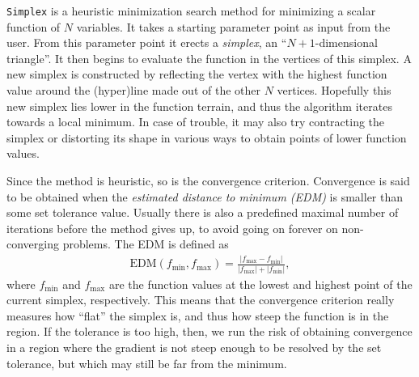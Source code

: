 \documentclass[twoside,english]{uiofysmaster}
\begin{document}
{\tt Simplex} \cite{nelder1965simplex} is a heuristic minimization search method for minimizing a scalar function of $N$ variables. It takes a starting parameter point as input from the user. From this parameter point it erects a {\it simplex}, an ``$N+1$-dimensional triangle''. It then begins to evaluate the function in the vertices of this simplex. A new simplex is constructed by reflecting the vertex with the highest function value around the (hyper)line made out of the other $N$ vertices. Hopefully this new simplex lies lower in the function terrain, and thus the algorithm iterates towards a local minimum. In case of trouble, it may also try contracting the simplex or distorting its shape in various ways to obtain points of lower function values. 

Since the method is heuristic, so is the convergence criterion. Convergence is said to be obtained when the {\it estimated distance to minimum (EDM)} is smaller than some set tolerance value. Usually there is also a predefined maximal number of iterations before the method gives up, to avoid going on forever on non-converging problems. The EDM is defined as
\begin{align}
	\mathrm{EDM}(f_\mathrm{min},f_\mathrm{max}) = \frac{|f_\mathrm{max}-f_\mathrm{min}|}{|f_\mathrm{max}| + |f_\mathrm{min}|},
\end{align}
where $f_\mathrm{min}$ and $f_\mathrm{max}$ are the function values at the lowest and highest point of the current simplex, respectively. This means that the convergence criterion really measures how ``flat'' the simplex is, and thus how steep the function is in the region. If the tolerance is too high, then, we run the risk of obtaining convergence in a region where the gradient is not steep enough to be resolved by the set tolerance, but which may still be far from the minimum.
\end{document}
